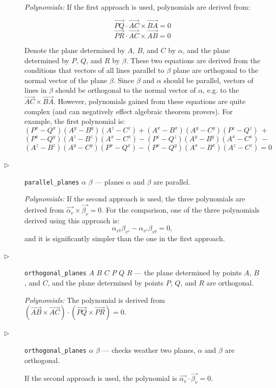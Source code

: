 \documentclass[final,1p,times,authoryear]{elsarticle}
\begin{document}
\begin{description}
{\em Polynomials:} If the first approach is used, polynomials are
derived from:

$$\overrightarrow{PQ}\cdot \overrightarrow{AC} \times \overrightarrow{BA} = 0$$
$$\overrightarrow{PR}\cdot \overrightarrow{AC} \times \overrightarrow{AB} = 0$$

Denote the plane determined by $A$, $B$, and $C$ by $\alpha$, and the
plane determined by $P$, $Q$, and $R$ by $\beta$. These two equations
are derived from the conditions that vectors of all lines parallel to
$\beta$ plane are orthogonal to the normal vector of the plane
$\beta$. Since $\beta$ and $\alpha$ should be parallel, vectors of
lines in $\beta$ should be orthogonal to the normal vector of
$\alpha$, e.g. to the
$\overrightarrow{AC} \times \overrightarrow{BA}$.  However,
polynomials gained from these equations are quite complex (and can
negatively effect algebraic theorem provers). For example, the first
polynomial is:
$$(P^x - Q^x)(A^y - B^y)(A^z - C^z) + (A^x - B^x)(A^y - C^y)(P^z - Q^z) \ +$$
$$(P^x - Q^y)(A^z - B^z)(A^x - C^x) - (P^z - Q^z)(A^y - B^y)(A^x - C^x) \ -$$
$$(A^z - B^z)(A^y - C^y)(P^x - Q^x) - (P^x - Q^y)(A^x - B^x)(A^z - C^z) = 0$$


\item[$\triangleright$] {\tt parallel\_planes} $\alpha$ $\beta$ ---
  planes $\alpha$ and $\beta$ are parallel.

{\em Polynomials:} 
If the second approach is used, the three polynomials are derived from
$\overrightarrow{\alpha_v} \times \overrightarrow{\beta_v} = 0.$ For
the comparison, one of the three polynomials derived using this
approach is:
$$\alpha_{v^y}\beta_{v^z} - \alpha_{v^z}\beta_{v^y} = 0,$$
and it is significantly simpler than the one in the first approach.

\item[$\triangleright$] {\tt orthogonal\_planes} $A$ $B$ $C$ $P$ $Q$ $R$
  --- the plane determined by points $A$, $B$, and $C$, and the plane
  determined by points $P$, $Q$, and $R$ are orthogonal.

  {\em Polynomials:} The polynomial is derived from
  $(\overrightarrow{AB} \times \overrightarrow{AC}) \cdot
  (\overrightarrow{PQ} \times \overrightarrow{PR}) = 0$.

\item[$\triangleright$] {\tt orthogonal\_planes} $\alpha$ $\beta$ ---
  checks weather two planes, $\alpha$ and $\beta$ are orthogonal.


If the second approach is used, the polynomial is
$\overrightarrow{\alpha_v} \cdot \overrightarrow{\beta_v} = 0$.


\end{description}
\end{document}
